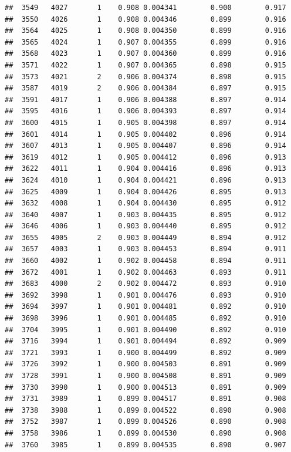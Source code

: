 \documentclass[
]{book}
\begin{document}
\begin{verbatim}
##  3549   4027       1    0.908 0.004341        0.900        0.917
##  3550   4026       1    0.908 0.004346        0.899        0.916
##  3564   4025       1    0.908 0.004350        0.899        0.916
##  3565   4024       1    0.907 0.004355        0.899        0.916
##  3568   4023       1    0.907 0.004360        0.899        0.916
##  3571   4022       1    0.907 0.004365        0.898        0.915
##  3573   4021       2    0.906 0.004374        0.898        0.915
##  3587   4019       2    0.906 0.004384        0.897        0.915
##  3591   4017       1    0.906 0.004388        0.897        0.914
##  3595   4016       1    0.906 0.004393        0.897        0.914
##  3600   4015       1    0.905 0.004398        0.897        0.914
##  3601   4014       1    0.905 0.004402        0.896        0.914
##  3607   4013       1    0.905 0.004407        0.896        0.914
##  3619   4012       1    0.905 0.004412        0.896        0.913
##  3622   4011       1    0.904 0.004416        0.896        0.913
##  3624   4010       1    0.904 0.004421        0.896        0.913
##  3625   4009       1    0.904 0.004426        0.895        0.913
##  3632   4008       1    0.904 0.004430        0.895        0.912
##  3640   4007       1    0.903 0.004435        0.895        0.912
##  3646   4006       1    0.903 0.004440        0.895        0.912
##  3655   4005       2    0.903 0.004449        0.894        0.912
##  3657   4003       1    0.903 0.004453        0.894        0.911
##  3660   4002       1    0.902 0.004458        0.894        0.911
##  3672   4001       1    0.902 0.004463        0.893        0.911
##  3683   4000       2    0.902 0.004472        0.893        0.910
##  3692   3998       1    0.901 0.004476        0.893        0.910
##  3694   3997       1    0.901 0.004481        0.892        0.910
##  3698   3996       1    0.901 0.004485        0.892        0.910
##  3704   3995       1    0.901 0.004490        0.892        0.910
##  3716   3994       1    0.901 0.004494        0.892        0.909
##  3721   3993       1    0.900 0.004499        0.892        0.909
##  3726   3992       1    0.900 0.004503        0.891        0.909
##  3728   3991       1    0.900 0.004508        0.891        0.909
##  3730   3990       1    0.900 0.004513        0.891        0.909
##  3731   3989       1    0.899 0.004517        0.891        0.908
##  3738   3988       1    0.899 0.004522        0.890        0.908
##  3752   3987       1    0.899 0.004526        0.890        0.908
##  3758   3986       1    0.899 0.004530        0.890        0.908
##  3760   3985       1    0.899 0.004535        0.890        0.907

\end{verbatim}
\end{document}
